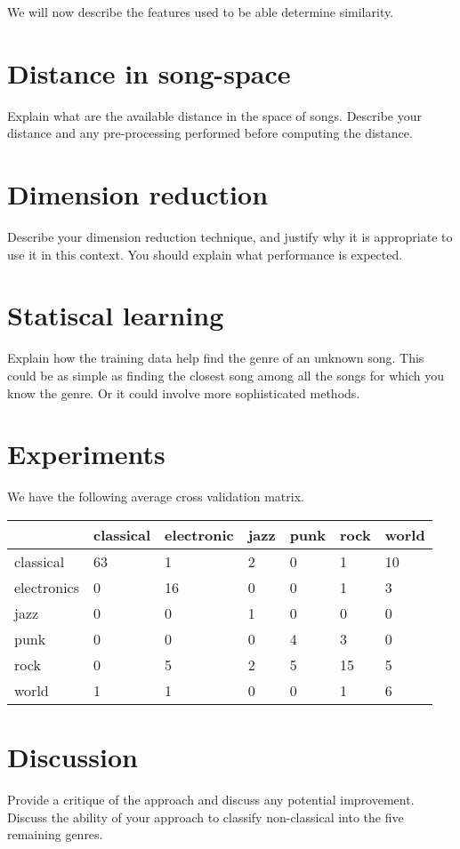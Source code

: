 \documentclass[12pt]{article}
\begin{document}
\indent We will now describe the features used to be able determine similarity. 
\section{Distance in song-space}
Explain what are the available distance in the space of songs.
Describe your distance and any pre-processing performed before
computing the distance.
\section{Dimension reduction}
Describe your dimension reduction technique, and justify why it 
is appropriate to use it in this context. You should explain what 
performance is expected.
\section{Statiscal learning}
Explain how the training data help find the genre of an unknown
song. This could be as simple as finding the closest song among all
the songs for which you know the genre. Or it could involve more
sophisticated methods.
\section{Experiments}

We have the following average cross validation matrix. 
\begin{center}
 \begin{tabular}{l| |l | l | l | l | l | l | }
&classical &electronic& jazz &punk& rock &world \\ \hline \hline
classical &63 & 1 & 2 & 0 & 1 & 10 \\ \hline 
electronics& 0 & 16 & 0 & 0 & 1 & 3 \\ \hline 
jazz& 0 & 0 & 1 & 0 & 0 & 0 \\ \hline 
punk &0 & 0 & 0 & 4 & 3 & 0 \\ \hline 
rock& 0 & 5 & 2 & 5 & 15 & 5 \\ \hline 
world&1 & 1 & 0 & 0 & 1 & 6 \\ \hline 
\end{tabular}
\end{center}
\section{Discussion}
Provide a critique of the approach and discuss any potential
improvement. Discuss the ability of your approach to classify
non-classical into the five remaining genres.
\end{document}
